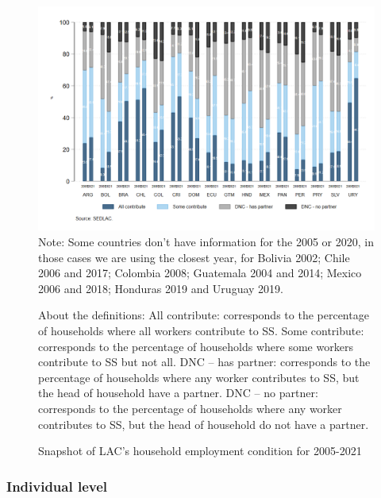 \documentclass[english]{article}
\begin{document}
\begin{figure}[!htb]
    \centering
     \caption{Snapshot of LAC’s household employment condition for 2005-2021}     
     \includegraphics[scale=.3]{latex/figures/Household/snapshot_household_2005-2021.png}
    \label{fig:Household20052021}
    \footnotesize{Note: Some countries don’t have information for the 2005 or 2020, in those cases we are using the closest year, for Bolivia 2002; Chile 2006 and 2017; Colombia 2008; Guatemala 2004 and 2014; Mexico 2006 and 2018; Honduras 2019 and Uruguay 2019.}
    
    \footnotesize{About the definitions: All contribute: corresponds to the percentage of households where all workers contribute to SS. Some contribute: corresponds to the percentage of households where some workers contribute to SS but not all. DNC – has partner: corresponds to the percentage of households where any worker contributes to SS, but the head of household have a partner. DNC – no partner: corresponds to the percentage of households where any worker contributes to SS, but the head of household do not have a partner.}
\end{figure}

\subsubsection{Individual level} %
\end{document}
